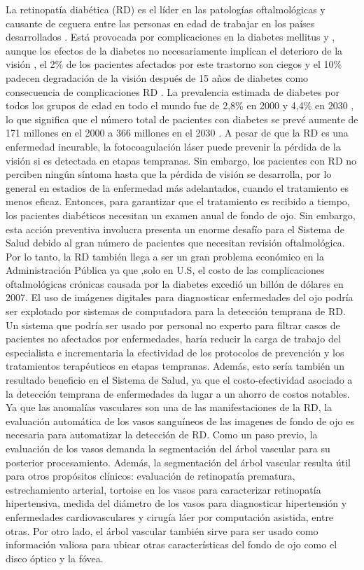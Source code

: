 La retinopat\'ia diab\'etica (RD) es el l\'ider en las patolog\'ias oftalmol\'ogicas y causante de ceguera entre las personas en edad de trabajar en los pa\'ises desarrollados . Est\'a provocada por complicaciones en la diabetes mellitus y , aunque los efectos de la diabetes no necesariamente implican el deterioro de la visión , el 2\% de los pacientes afectados por este trastorno son ciegos y el 10\% padecen  degradaci\'on de la visi\'on despu\'es de 15 años de diabetes como consecuencia de complicaciones RD . La prevalencia estimada de diabetes por todos los grupos de edad en todo el mundo fue de 2,8\% en 2000 y 4,4\% en 2030 , lo que significa que el n\'umero total de pacientes con diabetes se prev\'e aumente de 171 millones en el  2000 a 366 millones en el 2030 .
	A pesar de que la RD es una enfermedad incurable, la fotocoagulaci\'on l\'aser puede prevenir la p\'erdida de la visi\'on si es detectada en etapas tempranas. Sin embargo, los pacientes con RD no perciben ning\'un s\'intoma hasta que la p\'erdida de visi\'on se desarrolla, por lo general en estadios de la enfermedad más adelantados, cuando el tratamiento es menos eficaz. Entonces, para garantizar que el tratamiento es recibido a tiempo, los pacientes diab\'eticos necesitan un examen anual de fondo de ojo. Sin embargo, esta acci\'on preventiva involucra presenta un enorme desaf\'io para el Sistema de Salud debido  al gran n\'umero de pacientes que necesitan revisi\'on oftalmológica. Por lo tanto, la RD tambi\'en llega a ser un gran problema econ\'omico en la  Administraci\'on P\'ublica ya que ,solo en U.S, el costo de las complicaciones oftalmol\'ogicas cr\'onicas causada por la diabetes excedi\'o un bill\'on de d\'olares en 2007.
El uso de im\'agenes digitales para diagnosticar enfermedades del ojo podr\'ia ser explotado por sistemas de computadora para la detecci\'on temprana de RD. Un sistema que podr\'ia ser  usado por personal no experto para filtrar casos de pacientes no afectados por enfermedades, har\'ia reducir la carga de trabajo del especialista e incrementaria la efectividad de los protocolos de prevenci\'on y los tratamientos terap\'euticos en etapas tempranas. Adem\'as, esto ser\'ia tambi\'en un resultado beneficio en el Sistema de Salud, ya que el costo-efectividad asociado a la detecci\'on temprana de enfermedades da lugar a un ahorro de costos notables.
Ya que las anomal\'ias vasculares son una de las manifestaciones de la RD, la evaluaci\'on autom\'atica de los vasos sangu\'ineos de las imagenes de fondo de ojo es necesaria para automatizar la detecci\'on de RD. Como un paso previo, la evaluaci\'on de los vasos demanda la segmentaci\'on del \'arbol vascular para su posterior procesamiento. Adem\'as, la segmentaci\'on del \'arbol vascular resulta \'util para otros prop\'ositos cl\'inicos: evaluaci\'on de retinopat\'ia prematura, estrechamiento arterial, tortoise en los vasos para caracterizar retinopat\'ia hipertensiva, medida del di\'ametro de los vasos para diagnosticar hipertensi\'on y enfermedades cardiovasculares y cirug\'ia l\'aer por computaci\'on asistida, entre otras.
Por otro lado, el \'arbol vascular tambi\'en sirve para ser usado como informaci\'on valiosa para ubicar otras caracter\'isticas del fondo de ojo como el disco \'optico y la f\'ovea. \cite{marin2011new}


